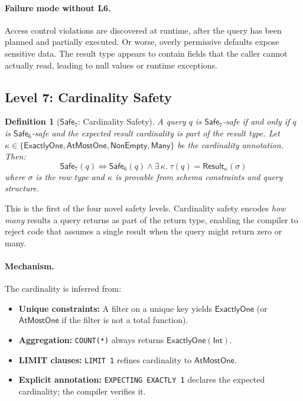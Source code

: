 \documentclass[11pt,a4paper]{article}
\newtheorem{definition}[theorem]{Definition}
\newcommand{\LevelN}[1]{\textsf{L#1}}
\newcommand{\Safe}[1]{\ensuremath{\mathsf{Safe}_{#1}}}
\begin{document}
\paragraph{Failure mode without \LevelN{6}.}
Access control violations are discovered at runtime, after the query
has been planned and partially executed.  Or worse, overly permissive
defaults expose sensitive data.  The result type appears to contain
fields that the caller cannot actually read, leading to null values
or runtime exceptions.

\subsection{Level 7: Cardinality Safety}\label{sec:L7}

\begin{definition}[\Safe{7}: Cardinality Safety]
A query $q$ is \Safe{7}-safe if and only if $q$ is \Safe{6}-safe and
the expected result cardinality is part of the result type.  Let
$\kappa \in \{\mathsf{ExactlyOne}, \mathsf{AtMostOne},
\mathsf{NonEmpty}, \mathsf{Many}\}$ be the cardinality annotation.
Then:
\[
  \Safe{7}(q) \iff \Safe{6}(q) \land
  \exists\, \kappa.\; \tau(q) = \mathsf{Result}_\kappa(\sigma)
\]
where $\sigma$ is the row type and $\kappa$ is provable from schema
constraints and query structure.
\end{definition}

This is the first of the four novel safety levels.  Cardinality safety
encodes \emph{how many} results a query returns as part of the return
type, enabling the compiler to reject code that assumes a single result
when the query might return zero or many.

\paragraph{Mechanism.}
The cardinality is inferred from:
\begin{itemize}[nosep]
  \item \textbf{Unique constraints:} A filter on a unique key yields
    $\mathsf{ExactlyOne}$ (or $\mathsf{AtMostOne}$ if the filter is
    not a total function).
  \item \textbf{Aggregation:} \texttt{COUNT(*)} always returns
    $\mathsf{ExactlyOne}(\mathsf{Int})$.
  \item \textbf{LIMIT clauses:} \texttt{LIMIT 1} refines cardinality
    to $\mathsf{AtMostOne}$.
  \item \textbf{Explicit annotation:} \texttt{EXPECTING EXACTLY 1}
    declares the expected cardinality; the compiler verifies it.
\end{itemize}
\end{document}
